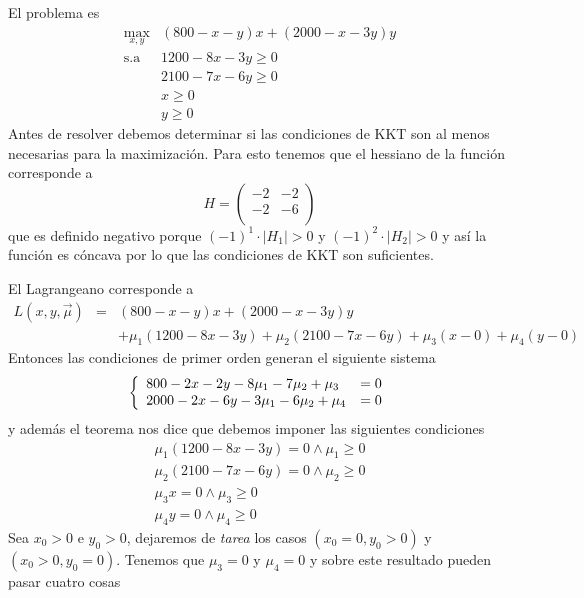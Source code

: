 \begin{solucion}
El problema es
\begin{equation*}
	\begin{array}{cl}
	\displaystyle \max_{x,y} & (800-x-y)x + (2000-x-3y)y	\\
	\text{s.a}				 & 1200-8x-3y\geq 0 		\\
							 & 2100-7x-6y\geq 0			\\
							 & x \geq 0 				\\
							 & y \geq 0
	\end{array}
\end{equation*}
Antes de resolver debemos determinar si las condiciones de KKT son al menos necesarias para la maximizaci\'on. Para esto tenemos que el hessiano de la funci\'on corresponde a
$$H = \left(
\begin{array}{cc} 
-2 & -2 \\
-2 & -6 \\
\end{array}\right)$$
que es definido negativo porque $(-1)^1 \cdot |H_1| > 0$ y $(-1)^2 \cdot |H_2| > 0$ y as\'i la funci\'on es c\'oncava por lo que las condiciones de KKT son suficientes.

El Lagrangeano corresponde a 
\begin{eqnarray*}
L(x,y,\vec{\mu})  &=& (800-x-y)x + (2000-x-3y)y \\
		 		& &  + \mu_1 (1200 - 8x-3y) + \mu_2 (2100 - 7x-6y) + \mu_3 (x-0) + \mu_4 (y-0)
\end{eqnarray*}
Entonces las condiciones de primer orden generan el siguiente sistema
$$
\left\{
\begin{array}
[c]{ll}%
800 -2x - 2y - 8\mu_1 - 7\mu_2 + \mu_3 &= 0\cr
2000 -2x - 6y - 3\mu_1 - 6\mu_2 + \mu_4 &= 0
\end{array}
\right.
$$
y adem\'as el teorema nos dice que debemos imponer las siguientes condiciones
\begin{align*}
\mu_1 (1200-8x-3y)=0 \wedge \mu_1 \geq 0 \\
\mu_2 (2100-7x-6y)=0 \wedge \mu_2 \geq 0 \\
\mu_3 x			  =0 \wedge \mu_3 \geq 0 \\ 
\mu_4 y			  =0 \wedge \mu_4 \geq 0 
\end{align*}
Sea $x_0 > 0$ e $y_0 > 0$, dejaremos de \emph{tarea} los casos $(x_0 = 0 , y_0 > 0)$ y $(x_0 >0,y_0 = 0)$.  Tenemos que $\mu_3 = 0$ y $\mu_4 = 0$ y sobre este resultado pueden pasar cuatro cosas


\end{solucion}

